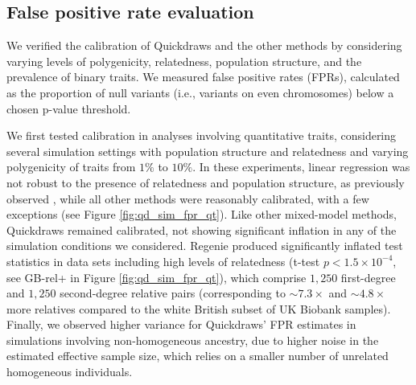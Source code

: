 \subsection{False positive rate evaluation}
We verified the calibration of Quickdraws and the other methods by considering varying levels of polygenicity, relatedness, population structure, and the prevalence of binary traits.
%
We measured false positive rates (FPRs), calculated as the proportion of null variants (i.e., variants on even chromosomes) below a chosen p-value threshold. 
%

%
We first tested calibration in analyses involving quantitative traits, considering several simulation settings with population structure and relatedness and varying polygenicity of traits from $1\%$ to $10\%$.
%
In these experiments, linear regression was not robust to the presence of relatedness and population structure, as previously observed \cite{yang2014advantages,loh2015efficient,jiang2019resource}, while all other methods were reasonably calibrated, with a few exceptions (see Figure \ref{fig:qd_sim_fpr_qt}).
%
Like other mixed-model methods, Quickdraws remained calibrated, not showing significant inflation in any of the simulation conditions we considered.
%
Regenie produced significantly inflated test statistics in data sets including high levels of relatedness (t-test $p < 1.5 \times 10^{-4}$, see GB-rel+ in Figure \ref{fig:qd_sim_fpr_qt}), which comprise $1{,}250$ first-degree and $1{,}250$ second-degree relative pairs (corresponding to ${\sim}7.3 \times$ and ${\sim}4.8 \times$ more relatives compared to the white British subset of UK Biobank samples).
%
Finally, we observed higher variance for Quickdraws' FPR estimates in simulations involving non-homogeneous ancestry, due to higher noise in the estimated effective sample size, which relies on a smaller number of unrelated homogeneous individuals.

